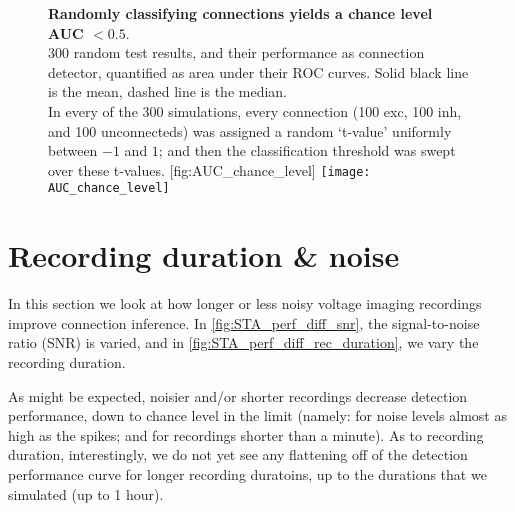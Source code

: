 \begin{figure}
    \begin{sidecaption}
        {\textbf{Randomly classifying connections yields a chance level AUC $< 0.5$}.\\
        300 random test results, and their performance as connection detector, quantified as area under their ROC curves. Solid black line is the mean, dashed line is the median.\\
        In every of the 300 simulations, every connection (100 exc, 100 inh, and 100 unconnecteds) was assigned a random `t-value' uniformly between $-1$ and $1$; and then the classification threshold was swept over these t-values.}
        [fig:AUC_chance_level]
        \texttt{[image: AUC\_chance\_level]}
    \end{sidecaption}
\end{figure}



\FloatBarrier
\section{Recording duration \& noise}

In this section we look at how longer or less noisy voltage imaging recordings improve connection inference. In \cref{fig:STA_perf_diff_snr}, the signal-to-noise ratio (SNR) is varied, and in \cref{fig:STA_perf_diff_rec_duration}, we vary the recording duration.

As might be expected, noisier and/or shorter recordings decrease detection performance, down to chance level in the limit (namely: for noise levels almost as high as the spikes; and for recordings shorter than a minute). As to recording duration, interestingly, we do not yet see any flattening off of the detection performance curve for longer recording duratoins, up to the durations that we simulated (up to 1 hour).

